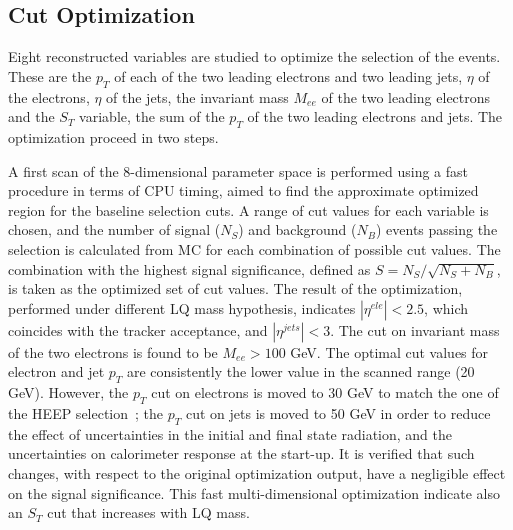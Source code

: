 

\clearpage

\subsection{Cut Optimization} \label{sec:cutOptimization}

Eight reconstructed variables are studied to optimize the selection of the events.
These are the $p_T$ of each of the two leading electrons and two leading jets, $\eta$
of the electrons, $\eta$ of the jets, the invariant mass $M_{ee}$ of the two leading electrons 
and the $S_T$ variable, the sum of the $p_T$ of the two leading electrons and jets.
The optimization proceed in two steps. 

A first scan of the 8-dimensional parameter space is performed using a fast procedure in terms of CPU timing, 
aimed to find the approximate optimized region for the baseline selection cuts.
A range of cut values for each variable is chosen, and the number of signal ($N_S$) 
and background ($N_B$) events passing the selection is calculated from MC for each combination 
of possible cut values. The combination with the highest signal significance, 
defined as $S = N_S/\sqrt{N_S+N_B}$, is taken as the optimized set of cut values. %
The result of the optimization, performed under different LQ mass hypothesis, 
indicates $|\eta^{ele}|<2.5$, which coincides with the tracker acceptance,
and $|\eta^{jets}|<3$. The cut on invariant mass of the two electrons is found to be $M_{ee}>100$ GeV. The 
optimal cut values for electron and jet $p_T$ are consistently the lower value in the scanned range 
(20 GeV). However, the $p_{T}$ cut on electrons is moved to 30 GeV to match the one of the HEEP 
selection~\cite{HEEPNOTE}; %
the $p_{T}$ cut on jets is moved to 50 GeV in order to reduce the effect 
of uncertainties in the initial and final state radiation, and the uncertainties 
on calorimeter response at the start-up. It is verified that such changes, with respect to the original 
optimization output, have a negligible effect on the signal significance. 
This fast multi-dimensional optimization indicate also an $S_T$ cut 
that increases with LQ mass. 


